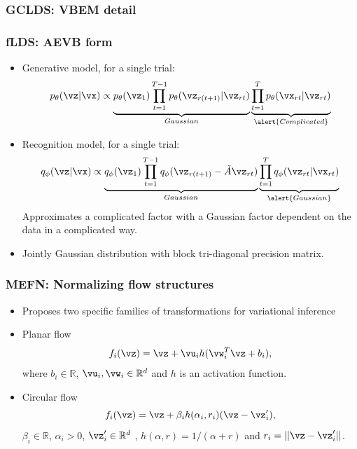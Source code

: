 \documentclass[16pt,presentation]{beamer}
\begin{document}
\begin{frame}
\frametitle{GCLDS: VBEM detail}
\end{frame}

\begin{frame}
\frametitle{fLDS: AEVB form}
\begin{itemize}
\item Generative model, for a single trial:
\[p_\theta(\vz | \vx) \propto \underbrace{p_\theta(\vz_{1})
\prod_{t=1}^{T-1}p_\theta(\vz_{r(t+1)} | \vz_{rt})}_{Gaussian} 
\underbrace{\prod_{t=1}^T p_\theta(\vx_{rt} | \vz_{rt})}_{\alert{Complicated}}
\]
\item Recognition model, for a single trial:
\[q_\phi(\vz | \vx) \propto \underbrace{q_\phi(\vz_{1}) 
\prod_{t=1}^{T-1}q_\phi(\vz_{r(t+1)} - \tilde{A}\vz_{rt}) }_{Gaussian}
\underbrace{\prod_{t=1}^T q_\phi(\vz_{rt} | \vx_{rt})}_{\alert{Gaussian}}
\]
Approximates a complicated factor with a Gaussian factor dependent on the data in a complicated way.
\item Jointly Gaussian distribution with block tri-diagonal precision matrix.
\end{itemize}
\end{frame}

\begin{frame}
\frametitle{MEFN: Normalizing flow structures}
\begin{itemize}
\item \textcite{Rezende2015} Proposes two specific families of transformations for variational inference
\item Planar flow%
\[f_i(\vz) = \vz + \vu_i h(\vw_i^{T} \vz+ b_i),\]
where $b_i \in \mathbb{R}$, $\vu_i, \vw_i \in \mathbb{R}^d$ and $h$ is an activation function. %
\item Circular flow
\[f_i(\vz) = \vz + \beta_i h(\alpha_i, r_i)(\vz - \vz'_i),\]
$\beta_i \in \mathbb{R}$, $\alpha_i >0$, $\vz'_i \in \mathbb{R}^d$ , $h(\alpha,r)=1/(\alpha+r)$ and $r_i = ||\vz-\vz'_i||$.
\end{itemize}
\end{frame}
\end{document}

